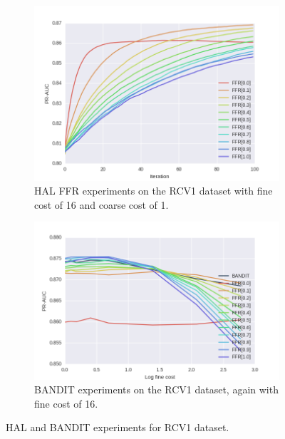 \documentclass[ms]{nuthesis}
\begin{document}
\FloatBarrier
\begin{figure}[!htb]
    \centering
    \begin{subfigure}[t]{0.75\textwidth}
        \centering
        \includegraphics[width=\textwidth]{fig/RCV1-16-nobandit}
        \caption{HAL FFR experiments on the RCV1 dataset with fine cost of 16 and coarse cost of 1.}

    \end{subfigure}%

    \begin{subfigure}[t]{0.75\textwidth}
        \centering
        \includegraphics[width=\textwidth]{fig/curve-RCV1}
        \caption{BANDIT experiments on the RCV1 dataset, again with fine cost of 16.}

    \end{subfigure}
    \caption{HAL and BANDIT experiments for RCV1 dataset.}
    \label{fig:RCV1-16-nobandit-curve-RCV1}
\end{figure}
\FloatBarrier
\end{document}
